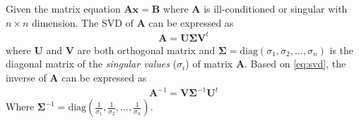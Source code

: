 			Given the matrix equation $\boldsymbol{Ax}=\boldsymbol{B}$ where $\boldsymbol{A}$ is ill-conditioned or singular with $n\times n$ dimension.
			The \gls{SVD} of $\boldsymbol{A}$ can be expressed as 				
			\begin{align}
				\boldsymbol{A} = \boldsymbol{U\Sigma V}^t
				\label{eq:svd}
			\end{align}
			where $\boldsymbol{U}$ and $\boldsymbol{V}$ are both orthogonal matrix and $\boldsymbol{\Sigma}=\mathrm{diag}(\sigma_1,\sigma_2,\dots,\sigma_n)$ is the diagonal matrix of the \emph{singular values} ($\sigma_i$) of matrix $\boldsymbol{A}$.
			Based on \cref{eq:svd}, the inverse of $\boldsymbol{A}$ can be expressed as
			\begin{align}
				\boldsymbol{A}^{-1}= \boldsymbol{V\Sigma}^{-1}\boldsymbol{U}^t
				\label{eq:svdInverse}
			\end{align}
			Where $
			\boldsymbol{\Sigma}^{-1} = \mathrm{diag}(\frac{1}{\sigma_1},\frac{1}{\sigma_2},\dots,\frac{1}{\sigma_n})$.
			
